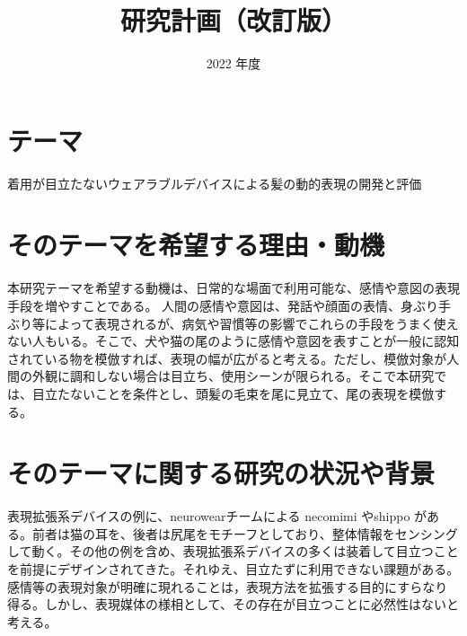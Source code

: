 \documentclass[a4paper]{jsarticle}
\begin{document}
\masterthesis %


\title{研究計画（改訂版）}
\date{2022 年度}
\maketitle


\setcounter{page}{1} %



\newpage

\setcounter{page}{1} %


\section{テーマ}
着用が目立たないウェアラブルデバイスによる髪の動的表現の開発と評価

\section{そのテーマを希望する理由・動機}
本研究テーマを希望する動機は、日常的な場面で利用可能な、感情や意図の表現手段を増やすことである。
人間の感情や意図は、発話や顔面の表情、身ぶり手ぶり等によって表現されるが、病気や習慣等の影響でこれらの手段をうまく使えない人もいる。そこで、犬や猫の尾のように感情や意図を表すことが一般に認知されている物を模倣すれば、表現の幅が広がると考える。ただし、模倣対象が人間の外観に調和しない場合は目立ち、使用シーンが限られる。そこで本研究では、目立たないことを条件とし、頭髪の毛束を尾に見立て、尾の表現を模倣する。


\section{そのテーマに関する研究の状況や背景}
表現拡張系デバイスの例に、neurowearチームによる necomimi \cite{necomimi}やshippo \cite{shippo}がある。前者は猫の耳を、後者は尻尾をモチーフとしており、整体情報をセンシングして動く。その他の例を含め、表現拡張系デバイスの多くは装着して目立つことを前提にデザインされてきた。それゆえ、目立たずに利用できない課題がある。感情等の表現対象が明確に現れることは，表現方法を拡張する目的にすらなり得る。しかし、表現媒体の様相として、その存在が目立つことに必然性はないと考える。
\end{document}
